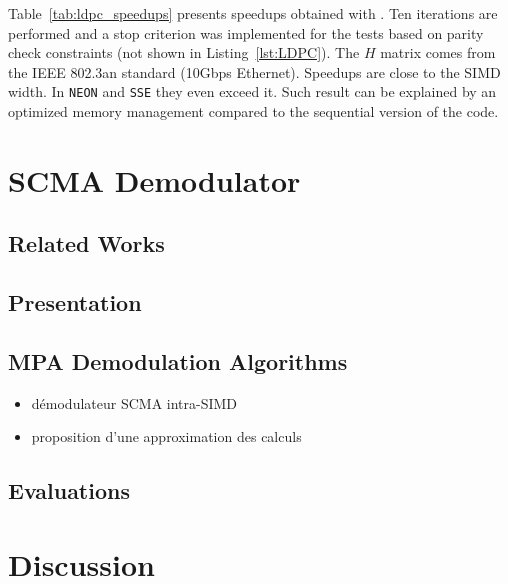 Table~\ref{tab:ldpc_speedups} presents speedups obtained with \MIPP. Ten
iterations are performed and a stop criterion was implemented for the tests
based on parity check constraints (not shown in Listing~\ref{lst:LDPC}). The $H$
matrix comes from the IEEE 802.3an standard (10Gbps Ethernet). Speedups are
close to the SIMD width. In \verb|NEON| and \verb|SSE| they even exceed it. Such
result can be explained by an optimized memory management compared to the
sequential version of the code.

\section{SCMA Demodulator~\cite{Ghaffari2019}}

\subsection{Related Works}

\subsection{Presentation}

\subsection{MPA Demodulation Algorithms}

\begin{itemize}
  \item démodulateur SCMA intra-SIMD
  \item proposition d'une approximation des calculs
\end{itemize}

\subsection{Evaluations}

\section{Discussion}
